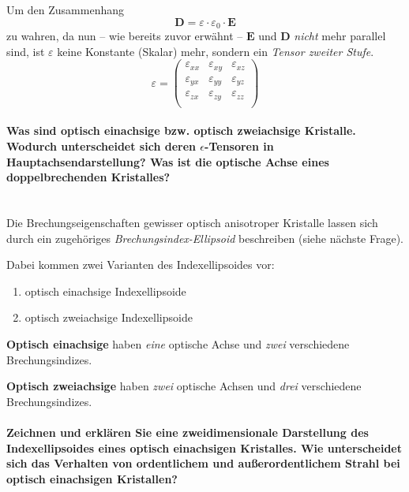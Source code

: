 \documentclass[a4paper, 11pt, ngerman, parskip=half-]{scrartcl}
\newcommand{\myparagraph}[1]{\paragraph{#1}\mbox{}\\}
\begin{document}
Um den Zusammenhang
\[\textbf{D} = \varepsilon \cdot \varepsilon_0 \cdot \textbf{E}\]
zu wahren, da nun -- wie bereits zuvor erwähnt -- $\textbf{E}$ und  $\textbf{D}$ \textit{nicht} mehr parallel sind, ist $\varepsilon$ keine Konstante (Skalar) mehr, sondern ein \textit{Tensor zweiter Stufe}.
\[\varepsilon = \begin{pmatrix}
    \varepsilon_{xx} & \varepsilon_{xy} & \varepsilon_{xz} \\
    \varepsilon_{yx} & \varepsilon_{yy} & \varepsilon_{yz} \\
    \varepsilon_{zx} & \varepsilon_{zy} & \varepsilon_{zz} \\
\end{pmatrix}\]


\myparagraph{Was sind optisch einachsige bzw. optisch zweiachsige Kristalle. Wodurch unterscheidet sich deren $\epsilon$-Tensoren in Hauptachsendarstellung? Was ist die optische Achse eines doppelbrechenden Kristalles?}
%
Die Brechungseigenschaften gewisser optisch anisotroper Kristalle lassen sich durch ein zugehöriges \textit{Brechungsindex-Ellipsoid} beschreiben (siehe nächste Frage).

Dabei kommen zwei Varianten des Indexellipsoides vor:
\begin{enumerate}
    \item optisch einachsige Indexellipsoide
    \item optisch zweiachsige Indexellipsoide
\end{enumerate}

\textbf{Optisch einachsige} haben \textit{eine} optische Achse und \textit{zwei} verschiedene Brechungsindizes.

\textbf{Optisch zweiachsige} haben \textit{zwei} optische Achsen und \textit{drei} verschiedene Brechungsindizes.


\paragraph{Zeichnen und erklären Sie eine zweidimensionale Darstellung des Indexellipsoides eines optisch einachsigen Kristalles. Wie unterscheidet sich das Verhalten von ordentlichem und außerordentlichem Strahl bei optisch einachsigen Kristallen?}
%
\end{document}
